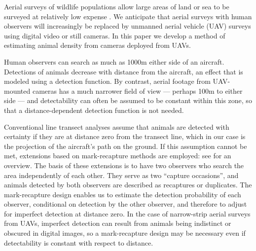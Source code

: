 \documentclass[useAMS, usenatbib, referee]{biom}\usepackage[]{graphicx}\usepackage[]{color}
\begin{document}

  Aerial surveys of wildlife populations allow large areas of land or sea to be surveyed at relatively low expense \citep{Henkel+al:07,Hammond+al:17}. We anticipate that aerial surveys with human observers will increasingly be replaced by unmanned aerial vehicle (UAV) surveys using digital video or still cameras. In this paper we develop a method of estimating animal density from cameras deployed from UAVs.

Human observers can search as much as 1000m either side of an aircraft. Detections of animals decrease with distance from the aircraft, an effect that is modeled using a detection function. By contrast, aerial footage from UAV-mounted cameras has a much narrower field of view --- perhaps 100m to either side --- and detectability can often be assumed to be constant within this zone, so that a distance-dependent detection function is not needed.

Conventional line transect analyses assume that animals are detected with certainty if they are at distance zero from the transect line, which in our case is the projection of the aircraft's path on the ground. If this assumption cannot be met, extensions based on mark-recapture methods are employed: see \cite{Burt+al:14} for an overview. The basis of these extensions is to have two observers who search the area independently of each other. They serve as two ``capture occasions'', and animals detected by both observers are described as recaptures or duplicates. The mark-recapture design enables us to estimate the detection probability of each observer, conditional on detection by the other observer, and therefore to adjust for imperfect detection at distance zero. In the case of narrow-strip aerial surveys from UAVs, imperfect detection can result from animals being indistinct or obscured in digital images, so a mark-recapture design may be necessary even if detectability is constant with respect to distance.
\end{document}
